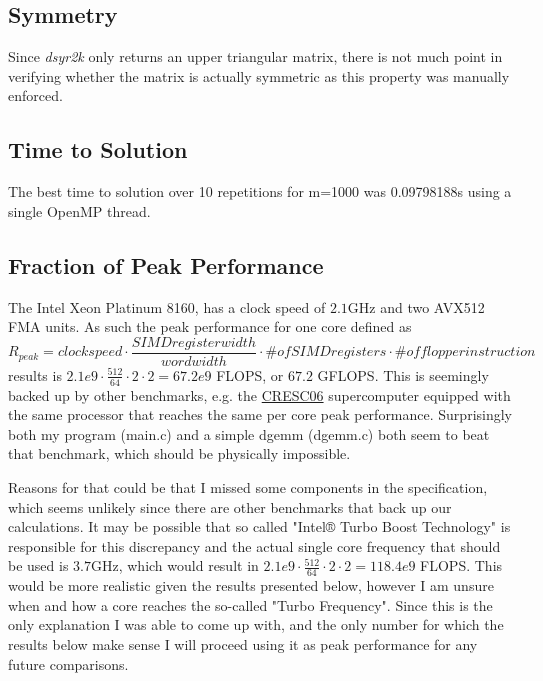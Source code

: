 \documentclass{scrartcl}
\begin{document}
\subsection{Symmetry}
Since \emph{dsyr2k} only returns an upper triangular matrix, there is not much point in verifying whether the matrix is actually symmetric as this property was manually enforced. 

\subsection{Time to Solution}

The best time to solution over 10 repetitions for m=1000 was 0.09798188s using a single OpenMP thread.

\subsection{Fraction of Peak Performance}
The Intel Xeon Platinum 8160, has a clock speed of $2.1$GHz and two AVX512 FMA units.
As such the peak performance for one core defined as 
\begin{equation}
	R_{peak} = clock speed \cdot \frac{SIMD register width}{word width} \cdot \# of SIMD registers \cdot \# of flop per instruction
\end{equation}
results is $2.1e9 \cdot \frac{512}{64} \cdot 2 \cdot 2 = 67.2e9$ FLOPS, or $67.2$ GFLOPS.
This is seemingly backed up by other benchmarks, e.g. the \href{https://www.top500.org/system/179574/}{CRESC06} supercomputer equipped with the same processor that reaches the same per core peak performance.
Surprisingly both my program (main.c) and a simple dgemm (dgemm.c) both seem to beat that benchmark, which should be physically impossible.

Reasons for that could be that I missed some components in the specification, which seems unlikely since there are other benchmarks that back up our calculations.
It may be possible that so called "Intel® Turbo Boost Technology" is responsible for this discrepancy and the actual single core frequency that should be used is $3.7$GHz, which would result in $2.1e9 \cdot \frac{512}{64} \cdot 2 \cdot 2 = 118.4e9$ FLOPS.
This would be more realistic given the results presented below, however I am unsure when and how a core reaches the so-called "Turbo Frequency".
Since this is the only explanation I was able to come up with, and the only number for which the results below make sense I will proceed using it as peak performance for any future comparisons.
\end{document}
